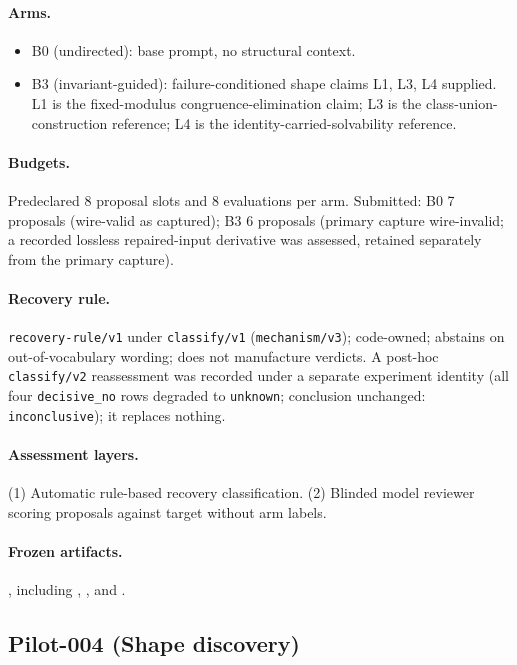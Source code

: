 \documentclass[11pt]{article}
\theoremstyle{gowthm}
\theoremstyle{gowplain}
\begin{document}
\paragraph{Arms.}
\begin{itemize}[nosep]
  \item B0 (undirected): base prompt, no structural context.
  \item B3 (invariant-guided): failure-conditioned shape claims L1, L3, L4 supplied.
    L1 is the fixed-modulus congruence-elimination claim; L3 is the
    class-union-construction reference; L4 is the identity-carried-solvability
    reference.
\end{itemize}

\paragraph{Budgets.} Predeclared 8 proposal slots and 8 evaluations per arm.
Submitted: B0 7 proposals (wire-valid as captured); B3 6 proposals (primary
capture wire-invalid; a recorded lossless repaired-input derivative was
assessed, retained separately from the primary capture).

\paragraph{Recovery rule.} \texttt{recovery-rule/v1} under \texttt{classify/v1}
(\texttt{mechanism/v3}); code-owned; abstains on out-of-vocabulary wording; does
not manufacture verdicts. A post-hoc \texttt{classify/v2} reassessment was
recorded under a separate experiment identity (all four \texttt{decisive\_no}
rows degraded to \texttt{unknown}; conclusion unchanged: \texttt{inconclusive});
it replaces nothing.

\paragraph{Assessment layers.}
(1) Automatic rule-based recovery classification. (2) Blinded model reviewer
scoring proposals against target without arm labels.

\paragraph{Frozen artifacts.} , including
, , and .

\subsection{Pilot-004 (Shape discovery)}
\end{document}

